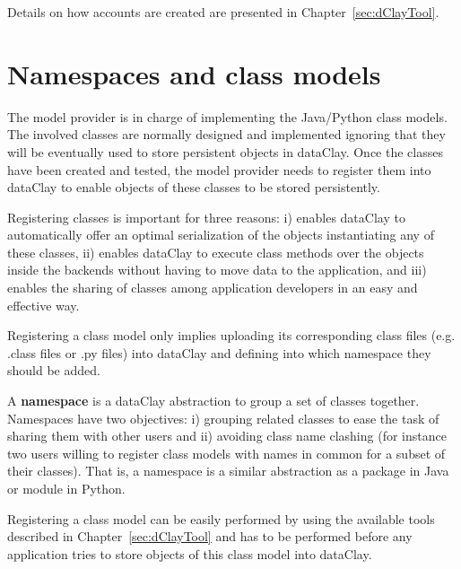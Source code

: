 Details on how accounts are created are presented in Chapter~\ref{sec:dClayTool}.

\section{Namespaces and class models}
\label{sec:ClassRegistration}

The model provider is in charge of implementing the Java/Python class models. The involved classes are normally designed and implemented ignoring that they will be eventually used to store persistent objects in dataClay. Once the classes have been created and tested, the model provider needs to register them into dataClay to enable objects of these classes to be stored persistently.

Registering classes is important for three reasons: i) enables dataClay to automatically offer an optimal serialization of the objects instantiating any of these classes, ii) enables dataClay to execute class methods over the objects inside the backends without having to move data to the application, and iii) enables the sharing of classes among application developers in an easy and effective way.

Registering a class model only implies uploading its corresponding class files (e.g. .class files or .py files) into dataClay and defining into which namespace they should be added.

A {\bf namespace} is a dataClay abstraction to group a set of classes together. Namespaces have two objectives: i) grouping related classes to ease the task of sharing them with other users and ii) avoiding class name clashing (for instance two users willing to register class models with names in common for a subset of their classes). That is, a namespace is a similar abstraction as a package in Java or module in Python.

Registering a class model can be easily performed by using the available tools described in Chapter~\ref{sec:dClayTool} and has to be performed before any application tries to store objects of this class model into dataClay.

% 

